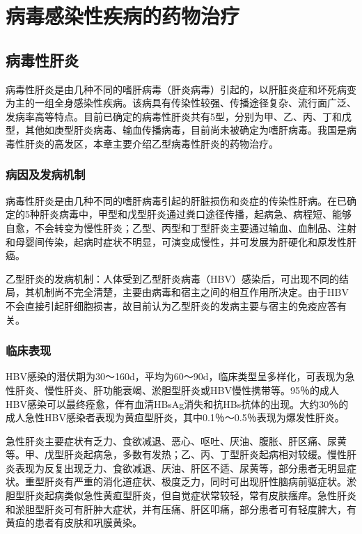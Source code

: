 \chapter{病毒感染性疾病的药物治疗}

\section{病毒性肝炎}

病毒性肝炎是由几种不同的嗜肝病毒（肝炎病毒）引起的，以肝脏炎症和坏死病变为主的一组全身感染性疾病。该病具有传染性较强、传播途径复杂、流行面广泛、发病率高等特点。目前已确定的病毒性肝炎共有5型，分别为甲、乙、丙、丁和戊型，其他如庚型肝炎病毒、输血传播病毒，目前尚未被确定为嗜肝病毒。我国是病毒性肝炎的高发区，本章主要介绍乙型病毒性肝炎的药物治疗。

\subsection{病因及发病机制}

病毒性肝炎是由几种不同的嗜肝病毒引起的肝脏损伤和炎症的传染性肝病。在已确定的5种肝炎病毒中，甲型和戊型肝炎通过粪口途径传播，起病急、病程短、能够自愈，不会转变为慢性肝炎；乙型、丙型和丁型肝炎主要通过输血、血制品、注射和母婴间传染，起病时症状不明显，可演变成慢性，并可发展为肝硬化和原发性肝癌。

乙型肝炎的发病机制：人体受到乙型肝炎病毒（HBV）感染后，可出现不同的结局，其机制尚不完全清楚，主要由病毒和宿主之间的相互作用所决定。由于HBV不会直接引起肝细胞损害，故目前认为乙型肝炎的发病主要与宿主的免疫应答有关。

\subsection{临床表现}

HBV感染的潜伏期为30～160d，平均为60～90d，临床类型呈多样化，可表现为急性肝炎、慢性肝炎、肝功能衰竭、淤胆型肝炎或HBV慢性携带等。95％的成人HBV感染可以最终痊愈，伴有血清HBsAg消失和抗HBs抗体的出现。大约30％的成人急性HBV感染者表现为黄疸型肝炎，其中0.1％～0.5％表现为爆发性肝炎。

急性肝炎主要症状有乏力、食欲减退、恶心、呕吐、厌油、腹胀、肝区痛、尿黄等。甲、戊型肝炎起病急，多数有发热；乙、丙、丁型肝炎起病相对较缓。慢性肝炎表现为反复出现乏力、食欲减退、厌油、肝区不适、尿黄等，部分患者无明显症状。重型肝炎有严重的消化道症状、极度乏力，同时可出现肝性脑病前驱症状。淤胆型肝炎起病类似急性黄疸型肝炎，但自觉症状常较轻，常有皮肤瘙痒。急性肝炎和淤胆型肝炎可有肝肿大症状，并有压痛、肝区叩痛，部分患者可有轻度脾大，有黄疸的患者有皮肤和巩膜黄染。

